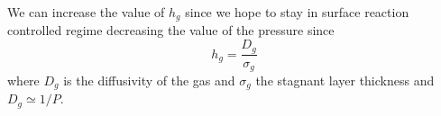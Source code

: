 \vspace{5mm}
We can increase the value of $h_g$ since we hope to stay in surface reaction controlled regime decreasing the value of the pressure since 
\begin{equation}
h_g=\frac{D_g}{\sigma_g}
\end{equation}
where $D_g$ is the diffusivity of the gas and $\sigma_g$ the stagnant layer thickness and $D_g\simeq 1/P$.\\








































